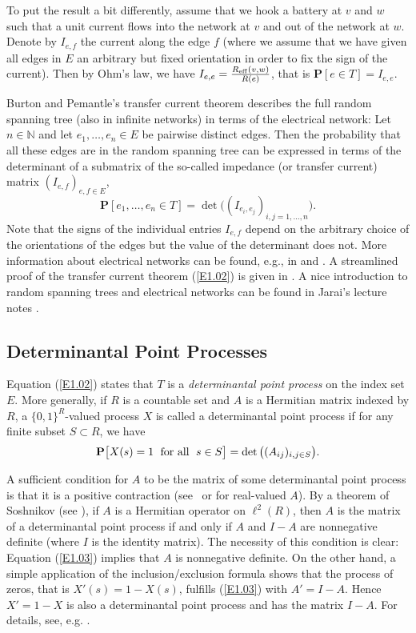 \documentclass[11pt]{article}
\providecommand{\1}{\mathBB{1}}
\newcommand{\mbs}[1]{\mbox{ \;#1\; }}
\renewcommand{\P}{\mathbf{P}}
\newcommand{\N}{{\mathbb{N}}}
\newcommand{\equ}[1]{(\ref{#1})}
\begin{document}
To put the result a bit differently, assume that we hook a battery at $v$ and $w$ such that a unit current flows into the network at $v$ and out of the network at $w$. Denote by $I_{e,f}$ the current along the edge $f$ (where we assume that we have given all edges in $E$ an arbitrary but fixed orientation in order to fix the sign of the current). Then by Ohm's law, we have $I_{e,e}=\frac{R_{\rm eff}(v,w)}{R(e)}$, that is $\P[e\in T]=I_{e,e}$.

Burton and Pemantle's transfer current theorem \cite{BurtonPemantle1993} describes the full random spanning tree (also in infinite networks) in terms of the electrical network: Let $n\in\N$ and let $e_1,\ldots,e_n\in E$ be pairwise distinct edges. Then the probability that all these edges are in the random spanning tree can be expressed in terms of the determinant of a submatrix of the so-called impedance (or transfer current) matrix $(I_{e,f})_{e,f\in E}$,
\begin{equation}
\label{E1.02}
\P[e_1,\ldots,e_n\in T]=\det\Big((I_{e_i,e_j})_{i,j=1,\ldots,n}\Big).
\end{equation}
Note that the signs of the individual entries $I_{e,f}$ depend on the arbitrary choice of the orientations of the edges but the value of the determinant does not.
More information about electrical networks can be found, e.g., in \cite{DoyleSnell1984} and \cite{LyonsPeres2016}. A streamlined proof of the transfer current theorem \equ{E1.02} is given in \cite{BenjaminiLyonsPeresSchramm2001}.
A nice introduction to random spanning trees and electrical networks can be found in Jarai's lecture notes \cite{Jarai2009}.

\subsection{Determinantal Point Processes}
\label{S1.2}
Equation \equ{E1.02} states that $T$ is a \emph{determinantal point process} on the index set $E$. More generally, if $R$ is a countable set and $A$ is a Hermitian matrix indexed by $R$, a $\{0,1\}^R$-valued process $X$ is called a determinantal point process if for any finite subset $S\subset R$, we have
\begin{equation}
\label{E1.03}
\P\big[X(s)=1\mbs{for all}s\in S\big]=\det\big((A_{ij})_{i,j\in S}\big).
\end{equation}

A sufficient condition for $A$ to be the matrix of some determinantal point process is that it is a positive contraction (see~\cite[Theorem 8.1]{Lyons2003} or \cite[Theorem~1.1]{ShiraiTakahashi2003II} for real-valued $A$). By a theorem of Soshnikov (see \cite[Theorem 3]{Soshnikov2000}), if $A$ is a Hermitian operator on $\ell^2(R)$, then $A$ is the matrix of a determinantal point process if and only if $A$ and $I-A$ are nonnegative definite (where $I$ is the identity matrix). The necessity of this condition is clear: Equation \equ{E1.03} implies that $A$ is nonnegative definite. On the other hand, a simple application of the inclusion/exclusion formula shows that the process of zeros, that is $X'(s)=1-X(s)$, fulfills \equ{E1.03} with $A'=I-A$. Hence $X'=1-X$ is also a determinantal point process and has the matrix $I-A$. For details, see, e.g. \cite[Section 2]{Gottlieb2007}.
\end{document}

